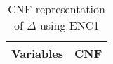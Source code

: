 \begin{table}[]
\centering
\caption{CNF representation of \(\Delta\) using ENC1}
\label{cnfRepresentationEnc1}
\begin{tabular}{c|cl}
\hline
Variables & \multicolumn{2}{c}{CNF}                                                                                                                                                                                                                                                                                                                                                                                                                                                                                                                                                                                                                                                                                                                                                                                                                                                                                                                                                                                                                                                                                                                                                                                                                                                                                                                                                                                                                                                                                                                                        \\ \hline

\end{tabular}
\end{table}
